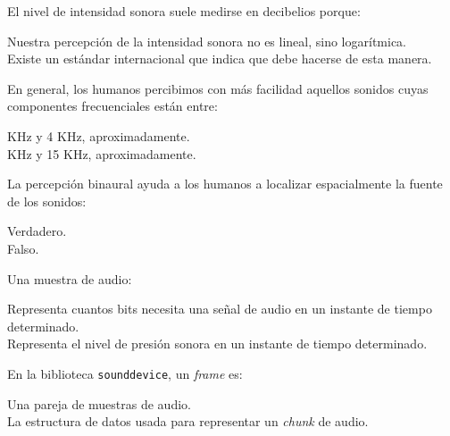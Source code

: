 \documentclass[legalpaper, 12pt, addpoints]{exam}
\begin{document}
\begin{questions}
\vspace{0.10in}

\question El nivel de intensidad sonora suele medirse en decibelios porque:

\begin{oneparchoices}
  \choice Nuestra percepción de la intensidad sonora no es lineal, sino logarítmica.\\
  \choice Existe un estándar internacional que indica que debe hacerse de esta manera.
\end{oneparchoices}

\vspace{0.10in}

\question En general, los humanos percibimos con más facilidad
aquellos sonidos cuyas componentes frecuenciales están entre:

\begin{oneparchoices}
   KHz y 4 KHz, aproximadamente.\\
   KHz y 15 KHz, aproximadamente.
\end{oneparchoices}
  
\vspace{0.10in}

\question La percepción binaural ayuda a los humanos a localizar espacialmente la fuente de los sonidos:

\begin{oneparchoices}
  \choice Verdadero.\\
  \choice Falso.
\end{oneparchoices}
  
\vspace{0.10in}

\question Una muestra de audio:

\begin{oneparchoices}
  \choice Representa cuantos bits necesita una señal de audio en un instante de tiempo determinado.\\
  \choice Representa el nivel de presión sonora en un instante de tiempo determinado.
\end{oneparchoices}
  
\vspace{0.10in}

\question En la biblioteca \texttt{sounddevice}, un \emph{frame} es:

\begin{oneparchoices}
  \choice Una pareja de muestras de audio.\\
  \choice La estructura de datos usada para representar un \emph{chunk} de audio.
\end{oneparchoices}
  

\end{questions}
\end{document}
